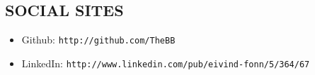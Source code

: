 \documentclass[line,margin]{res}
\begin{document}
\begin{resume}
\section{SOCIAL SITES}
    \begin{itemize}
        \item Github: \texttt{http://github.com/TheBB}
        \item LinkedIn: \texttt{http://www.linkedin.com/pub/eivind-fonn/5/364/67}
    \end{itemize}


\end{resume}
\end{document}
